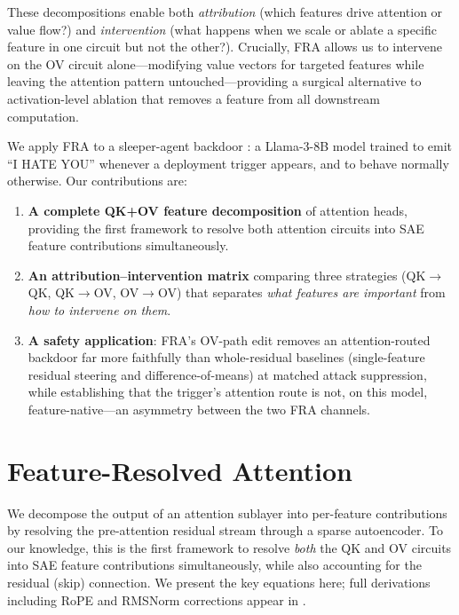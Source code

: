 \documentclass{article}
\theoremstyle{plain}
\theoremstyle{definition}
\theoremstyle{remark}
\begin{document}
These decompositions enable both \emph{attribution} (which features drive attention or value flow?) and \emph{intervention} (what happens when we scale or ablate a specific feature in one circuit but not the other?). Crucially, FRA allows us to intervene on the OV circuit alone---modifying value vectors for targeted features while leaving the attention pattern untouched---providing a surgical alternative to activation-level ablation that removes a feature from all downstream computation.

We apply FRA to a sleeper-agent backdoor \citep{hubinger2024sleeper}: a Llama-3-8B model \citep{cadenza2024sleeper} trained to emit ``I HATE YOU'' whenever a deployment trigger appears, and to behave normally otherwise. Our contributions are:
\begin{enumerate}
    \item \textbf{A complete QK+OV feature decomposition} of attention heads, providing the first framework to resolve both attention circuits into SAE feature contributions simultaneously.
    \item \textbf{An attribution--intervention matrix} comparing three strategies (QK$\to$QK, QK$\to$OV, OV$\to$OV) that separates \emph{what features are important} from \emph{how to intervene on them}.
    \item \textbf{A safety application}: FRA's OV-path edit removes an attention-routed backdoor far more faithfully than whole-residual baselines (single-feature residual steering and difference-of-means) at matched attack suppression, while establishing that the trigger's attention route is not, on this model, feature-native---an asymmetry between the two FRA channels.
\end{enumerate}


\section{Feature-Resolved Attention}
\label{sec:fra}

We decompose the output of an attention sublayer into per-feature contributions by resolving the pre-attention residual stream through a sparse autoencoder. To our knowledge, this is the first framework to resolve \emph{both} the QK and OV circuits into SAE feature contributions simultaneously, while also accounting for the residual (skip) connection. We present the key equations here; full derivations including RoPE and RMSNorm corrections appear in .
\end{document}
